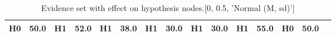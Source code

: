 \begin{table}
\begin{tabular}{c|cc|cc|cc|cc|cc|cc|cc}
\cellcolor{Bittersweet}H0&\cellcolor{Bittersweet}50.0&\cellcolor{Bittersweet}H1&\cellcolor{Bittersweet}52.0&\cellcolor{Bittersweet}H1&\cellcolor{Bittersweet}38.0&\cellcolor{Bittersweet}H1&\cellcolor{Bittersweet}30.0&\cellcolor{Bittersweet}H1&\cellcolor{Bittersweet}30.0&\cellcolor{Bittersweet}H1&\cellcolor{Bittersweet}55.0&\cellcolor{Bittersweet}H0&\cellcolor{Bittersweet}50.0\\\bottomrule\end{tabular}\caption{Evidence set with effect on hypothesis nodes.[0, 0.5, 'Normal (M, sd)']}\end{table}